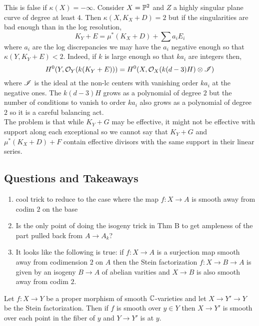\documentclass[12pt]{article}
\begin{document}
\begin{rmk}
This is false if $\kappa(X) = -\infty$. Consider $X = \P^2$ and $Z$ a highly singular plane curve of degree at least $4$. Then $\kappa(X, K_X + D) = 2$ but if the singularities are bad enough than in the log resolution,
\[ K_Y + E = \mu^* (K_X + D) + \sum a_i E_i \]
where $a_i$ are the log discrepancies we may have the $a_i$ negative enough so that $\kappa(Y, K_Y + E) < 2$. Indeed, if $k$ is large enough so that $k a_i$ are integers then,
\[ H^0(Y, \struct{Y}(k(K_Y + E))) = H^0(X, \struct{X}(k (d-3) H) \ot \I) \]
where $\I$ is the ideal at the non-lc centers with vanishing order $k a_i$ at the negative ones. The $k (d - 3) H$ grows as a polynomial of degree $2$ but the number of conditions to vanish to order $k a_i$ also grows as a polynomial of degree $2$ so it is a careful balancing act. 
\bigskip\\
The problem is that while $K_Y + G$ may be effective, it might not be effective with support along each exceptional so we cannot say that $K_Y + G$ and $\mu^* (K_X + D) + F$  contain effective divisors with the same support in their linear series.
\end{rmk}

\subsection{Questions and Takeaways}

\begin{enumerate}
\item cool trick to reduce to the case where the map $f : X \to A$ is smooth away from codim $2$ on the base
\item Is the only point of doing the isogeny trick in Thm B to get ampleness of the part pulled back from $A \to A_k$? 
\item It looks like the following is true: if $f : X \to A$ is a surjection map smooth away from codimension $2$ on $A$ then the Stein factorization $f : X \to B \to A$ is given by an isogeny $B \to A$ of abelian varities and $X \to B$ is also smooth away from codim $2$.
\end{enumerate}

\begin{lemma}
Let $f : X \to Y$ be a proper morphism of smooth $\CC$-varieties and let $X \to Y' \to Y$ be the Stein factorization. Then if $f$ is smooth over $y \in Y$ then $X \to Y'$ is smooth over each point in the fiber of $y$ and $Y \to Y'$ is \etale at $y$. 
\end{lemma}
\end{document}
